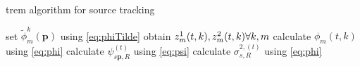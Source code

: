 \begin{algorithm}
\caption{\acrshort{trem} algorithm for source tracking}
\label{alg:trem}
\begin{algorithmic}
\State set $\tilde\phi^k_m(\mathbf{p})$ using \ref{eq:phiTilde}
\State obtain $z_m^1(t,k), z_m^2(t,k)\space\forall k,m$
\State calculate $\phi_m(t,k)$ using \ref{eq:phi}
\State calculate $\psi^{(t)}_{s\mathbf{p},R}$ using \ref{eq:psi}
\State calculate $\sigma^{2,(t)}_{s,R}$ using \ref{eq:phi}
\EndFor
\end{algorithmic}
\end{algorithm}